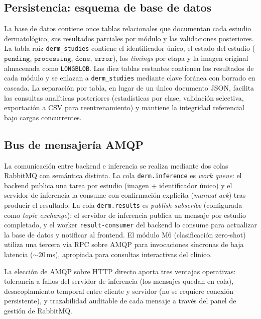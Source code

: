 \subsection{Persistencia: esquema de base de datos}
\label{sec:dermapixel-db}

La base de datos contiene once tablas relacionales que documentan
cada estudio dermatológico, sus resultados parciales por módulo y
las validaciones posteriores. La tabla raíz \texttt{derm\_studies}
contiene el identificador único, el estado del estudio
($\texttt{pending}$, $\texttt{processing}$, $\texttt{done}$,
$\texttt{error}$), los \emph{timings} por etapa y la imagen
original almacenada como \texttt{LONGBLOB}. Las diez tablas
restantes contienen los resultados de cada módulo y se enlazan a
\texttt{derm\_studies} mediante clave foránea con borrado en
cascada. La separación por tabla, en lugar de un único documento
JSON, facilita las consultas analíticas posteriores (estadísticas
por clase, validación selectiva, exportación a CSV para
reentrenamiento) y mantiene la integridad referencial bajo cargas
concurrentes.

\subsection{Bus de mensajería AMQP}
\label{sec:dermapixel-amqp}

La comunicación entre backend e inferencia se realiza mediante dos
colas RabbitMQ con semántica distinta. La cola
\texttt{derm.inference} es \emph{work queue}: el backend publica
una tarea por estudio (imagen + identificador único) y el servidor
de inferencia la consume con confirmación explícita
(\emph{manual ack}) tras producir el resultado. La cola
\texttt{derm.results} es \emph{publish-subscribe} (configurada
como \emph{topic exchange}): el servidor de inferencia publica un
mensaje por estudio completado, y el worker \texttt{result-consumer}
del backend lo consume para actualizar la base de datos y notificar
al frontend. El módulo M6 (clasificación zero-shot) utiliza una
tercera vía RPC sobre AMQP para invocaciones síncronas de baja
latencia ($\sim 20$\,ms), apropiada para consultas
interactivas del clínico.

La elección de AMQP sobre HTTP directo aporta tres ventajas
operativas: tolerancia a fallos del servidor de inferencia (los
mensajes quedan en cola), desacoplamiento temporal entre cliente y
servidor (no se requiere conexión persistente), y trazabilidad
auditable de cada mensaje a través del panel de gestión de
RabbitMQ.

